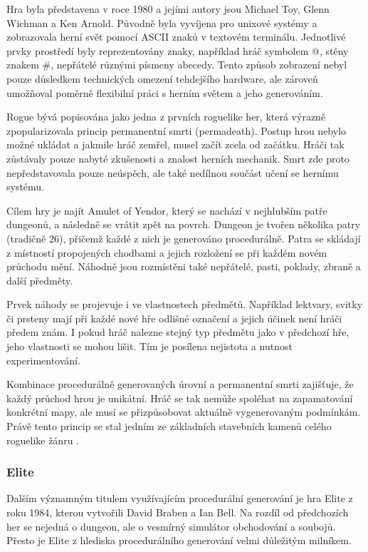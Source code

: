 \documentclass[
  program=itk,
  biblatex,
  figures=false,
  glossaries,
  index
]{kidiplom}
\begin{document}
Hra byla představena v roce 1980 a jejími autory jsou Michael Toy, Glenn Wichman a Ken Arnold. Původně byla vyvíjena pro unixové systémy a zobrazovala herní svět pomocí ASCII znaků v textovém terminálu. Jednotlivé prvky prostředí byly reprezentovány znaky, například hráč symbolem @, stěny znakem \#, nepřátelé různými písmeny abecedy. Tento způsob zobrazení nebyl pouze důsledkem technických omezení tehdejšího hardware, ale zároveň umožňoval poměrně flexibilní práci s herním světem a jeho generováním.

Rogue bývá popisována jako jedna z prvních roguelike her, která výrazně zpopularizovala princip permanentní smrti (permadeath). Postup hrou nebylo možné ukládat a jakmile hráč zemřel, musel začít zcela od začátku. Hráči tak zůstávaly pouze nabyté zkušenosti a znalost herních mechanik. Smrt zde proto nepředstavovala pouze neúspěch, ale také nedílnou součást učení se hernímu systému.

Cílem hry je najít Amulet of Yendor, který se nachází v nejhlubším patře dungeonů, a následně se vrátit zpět na povrch. Dungeon je tvořen několika patry (tradičně 26), přičemž každé z nich je generováno procedurálně. Patra se skládají z místností propojených chodbami a jejich rozložení se při každém novém průchodu mění. Náhodně jsou rozmístěni také nepřátelé, pasti, poklady, zbraně a další předměty.

Prvek náhody se projevuje i ve vlastnostech předmětů. Například lektvary, svitky či prsteny mají při každé nové hře odlišné označení a jejich účinek není hráči předem znám. I pokud hráč nalezne stejný typ předmětu jako v předchozí hře, jeho vlastnosti se mohou lišit. Tím je posílena nejistota a nutnost experimentování.

Kombinace procedurálně generovaných úrovní a permanentní smrti zajišťuje, že každý průchod hrou je unikátní. Hráč se tak nemůže spoléhat na zapamatování konkrétní mapy, ale musí se přizpůsobovat aktuálně vygenerovaným podmínkám. Právě tento princip se stal jedním ze základních stavebních kamenů celého roguelike žánru \cite{PCGRogue,enwiki:1337873899}.

\subsubsection{Elite}

Dalším významným titulem využívajícím procedurální generování je hra Elite z roku 1984, kterou vytvořili David Braben a Ian Bell. Na rozdíl od předchozích her se nejedná o dungeon, ale o vesmírný simulátor obchodování a soubojů. Přesto je Elite z hlediska procedurálního generování velmi důležitým milníkem.
\end{document}
